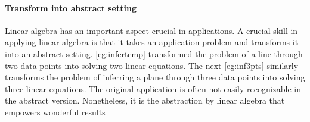 \paragraph{Transform into abstract setting}
Linear algebra has an important aspect crucial in applications.
A crucial skill in applying linear algebra is that it takes an application problem and transforms it into an abstract setting.
\cref{eg:infertemp} transformed the problem of  a line through two data points into solving two linear equations.
The next \cref{eg:inf3pts} similarly transforms the problem of inferring a plane through three data points into solving three linear equations.
The original application is often not easily recognizable in the abstract version. 
Nonetheless, it is the abstraction by linear algebra that empowers wonderful results 


